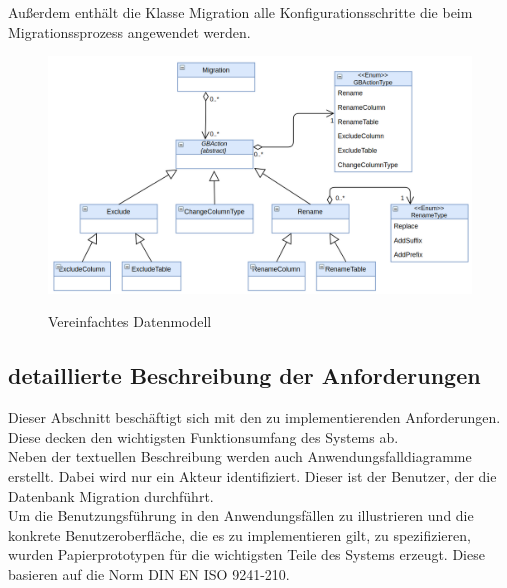 Außerdem enthält die Klasse Migration alle Konfigurationsschritte die beim Migrationssprozess angewendet werden.
\begin{figure}[H]
	\caption{Vereinfachtes Datenmodell}
	\centering
	\includegraphics[width=\textwidth]{images/sichten/abstract-datenmodell}
	\label{img:abstract-datenmodell}
\end{figure}






\subsection{detaillierte Beschreibung der Anforderungen}
Dieser Abschnitt beschäftigt sich mit den zu implementierenden Anforderungen. Diese decken den wichtigsten Funktionsumfang des Systems ab.\\
Neben der textuellen Beschreibung werden auch Anwendungsfalldiagramme erstellt. Dabei wird nur ein Akteur identifiziert. Dieser ist der Benutzer, der die Datenbank Migration durchführt. \\
Um die Benutzungsführung in den Anwendungsfällen zu illustrieren und die konkrete Benutzeroberfläche, die es zu implementieren gilt, zu spezifizieren, wurden Papierprototypen für die wichtigsten Teile des Systems erzeugt. Diese basieren  auf die Norm DIN EN ISO 9241-210.




